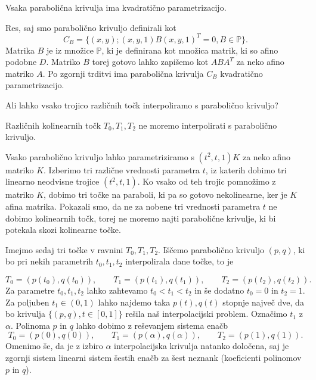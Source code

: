 \documentclass[mat1]{fmfdelo}
\newcommand{\PP}{\mathbb P}
\newcommand{\al}{\alpha}
\begin{document}
\begin{posledica}\label{vsakaparabola}
Vsaka parabolična krivulja ima kvadratično parametrizacijo.
\end{posledica}

\begin{dokaz}
Res, saj smo parabolično krivuljo definirali kot
$$ C_B = \{ (x,y); (x,y,1) B (x, y, 1)^T = 0, B \in \PP \}.$$
Matrika $B$ je iz množice $\PP$, ki je definirana kot množica matrik, ki so afino podobne $D$. Matriko $B$ torej gotovo lahko zapišemo kot $ABA^T$ za neko afino matriko $A$. Po zgornji trditvi ima parabolična krivulja $C_B$ kvadratično parametrizacijo.
\end{dokaz}

Ali lahko vsako trojico različnih točk interpoliramo s parabolično krivuljo? 

\begin{trditev}
Različnih kolinearnih točk $T_0, T_1, T_2$ ne moremo interpolirati s parabolično krivuljo.
\end{trditev}





\begin{dokaz}
Vsako parabolično krivuljo lahko parametriziramo s $(t^2, t,1)K$ za neko afino matriko $K$. Izberimo tri različne vrednosti parametra $t$, iz katerih dobimo tri linearno neodvisne trojice $(t^2, t, 1)$. Ko vsako od teh trojic pomnožimo z matriko $K$, dobimo tri točke na paraboli, ki pa so gotovo nekolinearne, ker je $K$ afina matrika. Pokazali smo, da ne za nobene tri vrednosti parametra $t$ ne dobimo kolinearnih točk, torej ne moremo najti parabolične krivulje, ki bi potekala skozi kolinearne točke.
\end{dokaz}

Imejmo sedaj tri točke v ravnini $T_0, T_1, T_2$. Iščemo parabolično krivuljo $(p, q)$, ki bo pri nekih parametrih $t_0, t_1, t_2$ interpolirala dane točke, to je %

$$ T_0 = (p(t_0), q(t_0)), \qquad T_1 = (p(t_1), q(t_1)), \qquad T_2 = (p(t_2), q(t_2)).$$
Za parametre $t_0, t_1, t_2$ lahko zahtevamo $t_0 < t_1 < t_2$ in še dodatno $t_0 = 0$ in $t_2 = 1$. Za poljuben $t_1 \in (0,1)$  lahko najdemo taka $p(t), q(t)$ stopnje največ dve, da bo krivulja $ \{(p, q), t \in [0,1] \}$ rešila naš interpolacijski problem. Označimo $t_1$ z $\al.$  Polinoma $p$ in $q$  lahko dobimo z reševanjem sistema enačb
\begin{equation}\label{sistem}
T_0 = (p(0), q(0)), \qquad T_1 = (p(\al), q(\al)), \qquad T_2 = (p(1), q(1)).
\end{equation}
Omenimo še, da je z izbiro $\al$ interpolacijska krivulja natanko določena, saj je zgornji sistem linearni sistem šestih enačb za šest neznank (koeficienti polinomov $p$ in $q$).
\end{document}
